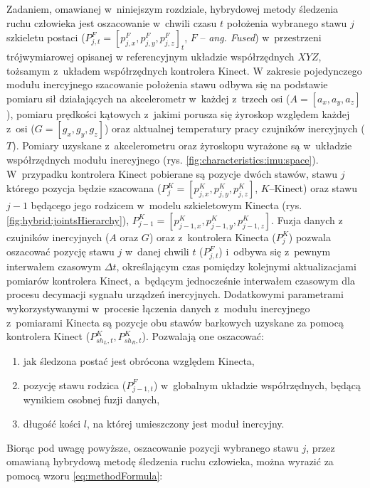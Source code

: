 		
Zadaniem, omawianej w~niniejszym rozdziale, hybrydowej metody śledzenia ruchu człowieka jest oszacowanie w~chwili czasu $t$ położenia wybranego stawu $j$ szkieletu postaci ($P^F_{j,t} = [p^F_{j,x}, p^F_{j,y}, p^F_{j,z}]_t$, $F$ -- \emph{ang. Fused})  w~przestrzeni trójwymiarowej opisanej w referencyjnym układzie współrzędnych $X Y Z$, tożsamym z~układem współrzędnych kontrolera Kinect. W zakresie pojedynczego modułu inercyjnego szacowanie położenia stawu odbywa się na podstawie pomiaru sił działających na akcelerometr w~każdej z~trzech osi ($A = [a_x, a_y, a_z]$), pomiaru prędkości kątowych z~jakimi porusza się żyroskop względem każdej z~osi ($G = [g_x, g_y, g_z]$) oraz aktualnej temperatury pracy czujników inercyjnych ($T$). Pomiary uzyskane z~akcelerometru oraz żyroskopu wyrażone są w~układzie współrzędnych modułu inercyjnego (rys. \ref{fig:characteristics:imu:space}). W~przypadku kontrolera Kinect pobierane są pozycje dwóch stawów, stawu $j$ którego pozycja będzie szacowana ($P^K_{j} = [p^K_{j,x}, p^K_{j,y}, p^K_{j,z}]$, $K$--Kinect) oraz stawu $j-1$ będącego jego rodzicem w~modelu szkieletowym Kinecta (rys. \ref{fig:hybrid:jointsHierarchy}), $P^K_{j-1} = [p^K_{j-1,x},p^K_{j-1,y}, p^K_{j-1,z}]$. Fuzja danych z czujników inercyjnych ($A$ oraz $G$) oraz z~kontrolera Kinecta ($P^K_j$) pozwala oszacować pozycję stawu $j$ w~danej chwili $t$ ($P^F_{j,t}$) i~odbywa się z~pewnym interwałem czasowym $\Delta t$, określającym czas pomiędzy kolejnymi aktualizacjami pomiarów kontrolera Kinect, a~będącym jednocześnie interwałem czasowym dla procesu decymacji sygnału urządzeń inercyjnych. Dodatkowymi parametrami wykorzystywanymi w~procesie łączenia danych z~modułu inercyjnego z~pomiarami Kinecta są pozycje obu stawów barkowych uzyskane za pomocą kontrolera Kinect ($P^K_{sh_L,t}, P^K_{sh_R,t}$). Pozwalają one oszacować:

\begin{enumerate}
	\item jak śledzona postać jest obrócona względem Kinecta,
	\item pozycję stawu rodzica ($P^F_{j-1,t}$) w~globalnym układzie współrzędnych, będącą wynikiem osobnej fuzji danych,
	\item długość kości $l$, na której umieszczony jest moduł inercyjny.
\end{enumerate}

Biorąc pod uwagę powyższe, oszacowanie pozycji wybranego stawu $j$, przez omawianą hybrydową metodę śledzenia ruchu człowieka, można wyrazić za pomocą wzoru \ref{eq:methodFormula}:
		
